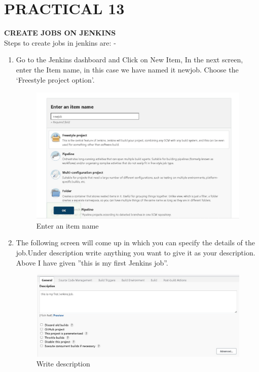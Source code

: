 \documentclass[12pt]{article}
\begin{document}
\clearpage

\section{PRACTICAL 13}

\textbf{\uppercase {Create Jobs on Jenkins}} 
\vspace{0.1\baselineskip} \\

Steps to create jobs in jenkins are: -

\begin{enumerate}
\item Go to the Jenkins dashboard and Click on New Item, In the next screen, enter the Item name, in this case we have named it newjob. Choose the ‘Freestyle project
option’.

\begin{figure}[H]
\centering
\includegraphics[scale=0.6]{fig64}
\caption{Enter an item name}
\vspace{0.6\baselineskip}
\end{figure}

\item The following screen will come up in which you can specify the details of the job.Under description write anything you want to give it as your description. Above I have given ”this is my first Jenkins job”.

\begin{figure}[H]
\centering
\includegraphics[scale=0.6]{fig65}
\caption{Write description}
\vspace{0.6\baselineskip}
\end{figure}


\end{enumerate}
\end{document}

